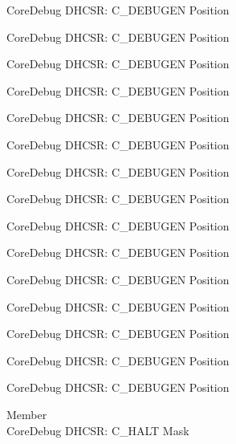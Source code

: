 \begin{DoxyRefList}
\label{deprecated__deprecated000127}%
%
Core\+Debug DHCSR\+: C\+\_\+\+DEBUGEN Position 

\label{deprecated__deprecated000183}%
%
Core\+Debug DHCSR\+: C\+\_\+\+DEBUGEN Position 

\label{deprecated__deprecated000266}%
%
Core\+Debug DHCSR\+: C\+\_\+\+DEBUGEN Position 

\label{deprecated__deprecated000325}%
%
Core\+Debug DHCSR\+: C\+\_\+\+DEBUGEN Position 

\label{deprecated__deprecated000401}%
%
Core\+Debug DHCSR\+: C\+\_\+\+DEBUGEN Position 

\label{deprecated__deprecated000490}%
%
Core\+Debug DHCSR\+: C\+\_\+\+DEBUGEN Position 

\label{deprecated__deprecated000592}%
%
Core\+Debug DHCSR\+: C\+\_\+\+DEBUGEN Position 

\label{deprecated__deprecated000698}%
%
Core\+Debug DHCSR\+: C\+\_\+\+DEBUGEN Position 

\label{deprecated__deprecated000786}%
%
Core\+Debug DHCSR\+: C\+\_\+\+DEBUGEN Position 

\label{deprecated__deprecated000842}%
%
Core\+Debug DHCSR\+: C\+\_\+\+DEBUGEN Position 

\label{deprecated__deprecated000925}%
%
Core\+Debug DHCSR\+: C\+\_\+\+DEBUGEN Position 

\label{deprecated__deprecated000984}%
%
Core\+Debug DHCSR\+: C\+\_\+\+DEBUGEN Position 

\label{deprecated__deprecated001060}%
%
Core\+Debug DHCSR\+: C\+\_\+\+DEBUGEN Position 

\label{deprecated__deprecated001149}%
%
Core\+Debug DHCSR\+: C\+\_\+\+DEBUGEN Position 

\label{deprecated__deprecated001251}%
%
Core\+Debug DHCSR\+: C\+\_\+\+DEBUGEN Position  
\item[Member \doxylink{group___c_m_s_i_s___core_debug_ga1d905a3aa594eb2e8bb78bcc4da05b3f}{Core\+Debug\+\_\+\+DHCSR\+\_\+\+C\+\_\+\+HALT\+\_\+\+Msk} ]\hfill \\
\label{deprecated__deprecated000038}%
%
Core\+Debug DHCSR\+: C\+\_\+\+HALT Mask 


\end{DoxyRefList}
